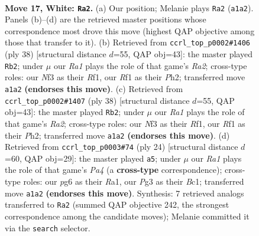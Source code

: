 \documentclass[11pt]{article}
\begin{document}
\clearpage

\begin{figure}[p]\centering
\begin{subfigure}{0.46\textwidth}\centering
\resizebox{\linewidth}{!}{%
\newchessgame
\chessboard[
  setfen={r1b1kb1r/2p5/1pn3p1/p4p1p/3P4/1PPB1NP1/5P1P/R1B2RK1 w q - 4 17},
  showmover=false,
  pgfstyle=straightmove, color=movearrow, markmove={a1-a2}
]}
\caption{}
\end{subfigure}\hfill
\begin{subfigure}{0.46\textwidth}\centering
\resizebox{\linewidth}{!}{%
\newchessgame
\chessboard[
  setfen={r1b1k2r/pp3ppp/2p1p3/1P4B1/1b1P4/4PN2/R1B1nPPP/5R1K w kq - 3 20},
  showmover=false,
  pgfstyle=straightmove, color=movearrow, markmove={a2-b2}
]}
\caption{}
\end{subfigure}
\\[4pt]
\begin{subfigure}{0.46\textwidth}\centering
\resizebox{\linewidth}{!}{%
\newchessgame
\chessboard[
  setfen={r1b1k2r/pp3ppp/2p1p3/1P4B1/1b1P4/4PN2/R1B1nPPP/5R1K w kq - 3 20},
  showmover=false,
  pgfstyle=straightmove, color=movearrow, markmove={a2-b2}
]}
\caption{}
\end{subfigure}\hfill
\begin{subfigure}{0.46\textwidth}\centering
\resizebox{\linewidth}{!}{%
\newchessgame
\chessboard[
  setfen={r1b1kb1r/1pp2ppp/p1p3n1/4P3/P7/2N2N1P/1PP2PP1/R1BR2K1 w - - 1 13},
  showmover=false,
  pgfstyle=straightmove, color=movearrow, markmove={a4-a5}
]}
\caption{}
\end{subfigure}
\caption{\textbf{Move 17, White: \texttt{Ra2}.} (a) Our position; Melanie plays \texttt{Ra2} (\texttt{a1a2}). Panels (b)--(d) are the retrieved master positions whose correspondence most drove this move (highest QAP objective among those that transfer to it). (b) Retrieved from \texttt{ccrl\_top\_p0002\#1406} (ply 38) [structural distance $d$=55, QAP obj=43]: the master played \texttt{Rb2}; under $\mu$ our \emph{Ra1} plays the role of that game's \emph{Ra2}; cross-type roles: our \emph{N}f3 as their \emph{R}f1, our \emph{R}f1 as their \emph{P}h2; transferred move \texttt{a1a2} \textbf{(endorses this move)}. (c) Retrieved from \texttt{ccrl\_top\_p0002\#1407} (ply 38) [structural distance $d$=55, QAP obj=43]: the master played \texttt{Rb2}; under $\mu$ our \emph{Ra1} plays the role of that game's \emph{Ra2}; cross-type roles: our \emph{N}f3 as their \emph{R}f1, our \emph{R}f1 as their \emph{P}h2; transferred move \texttt{a1a2} \textbf{(endorses this move)}. (d) Retrieved from \texttt{ccrl\_top\_p0003\#74} (ply 24) [structural distance $d$=60, QAP obj=29]: the master played \texttt{a5}; under $\mu$ our \emph{Ra1} plays the role of that game's \emph{Pa4} (a \textbf{cross-type} correspondence); cross-type roles: our \emph{p}g6 as their \emph{R}a1, our \emph{P}g3 as their \emph{B}c1; transferred move \texttt{a1a2} \textbf{(endorses this move)}. Synthesis: 7 retrieved analogs transferred to \texttt{Ra2} (summed QAP objective 242, the strongest correspondence among the candidate moves); Melanie committed it via the \texttt{search} selector.}
\label{fig:thought-m32}
\end{figure}
\end{document}
